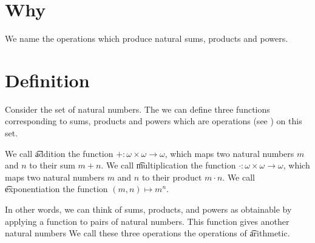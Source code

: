 
\section*{Why}

We name the operations which produce natural sums, products and powers.

\section*{Definition}

Consider the set of natural numbers.
The we can define three functions corresponding to sums, products and powers which are operations (see ) on this set.

We call \t{addition} the function $+: \omega  \times  \omega \to \omega $, which maps two natural numbers $m$ and $n$ to their sum $m + n$.
We call \t{multiplication} the function $\cdot : \omega  \times \omega  \to \omega $, which maps two natural numbers $m$ and $n$ to their product $m \cdot  n$.
We call \t{exponentiation} the function $(m, n) \mapsto m^n$.

In other words, we can think of sums, products, and powers as obtainable by applying a function to pairs of natural numbers.
This function gives another natural numbers
We call these three operations the operations of \t{arithmetic}.

\blankpage